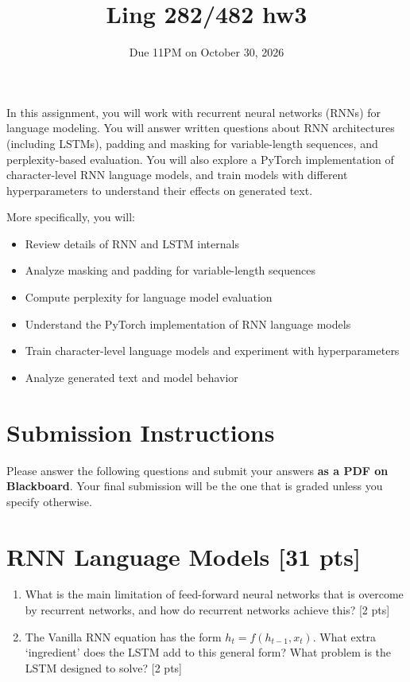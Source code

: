 \documentclass[11pt]{article}
\begin{document}
\title{Ling 282/482 hw3}
\date{\vspace{-0.2in}Due 11PM on October 30, 2026}
\maketitle

\noindent In this assignment, you will work with recurrent neural networks (RNNs) for language modeling. You will answer written questions about RNN architectures (including LSTMs), padding and masking for variable-length sequences, and perplexity-based evaluation. You will also explore a PyTorch implementation of character-level RNN language models, and train models with different hyperparameters to understand their effects on generated text.

\noindent More specifically, you will:
\begin{itemize}
    \item Review details of RNN and LSTM internals
    \item Analyze masking and padding for variable-length sequences
    \item Compute perplexity for language model evaluation
    \item Understand the PyTorch implementation of RNN language models
    \item Train character-level language models and experiment with hyperparameters
    \item Analyze generated text and model behavior
\end{itemize}

\section*{Submission Instructions}
\noindent Please answer the following questions and submit your answers \textbf{as a PDF on Blackboard}. Your final submission will be the one that is graded unless you specify otherwise.


\section{RNN Language Models [31 pts]}

\begin{enumerate}[label=\alph*., itemsep=2em]
  \item What is the main limitation of feed-forward neural networks that is overcome by recurrent networks, and how do recurrent networks achieve this? [2 pts]
  \item The Vanilla RNN equation has the form $h_t = f(h_{t-1}, x_t)$.  What extra `ingredient' does the LSTM add to this general form?  What problem is the LSTM designed to solve? [2 pts]
\end{enumerate}
\end{document}
